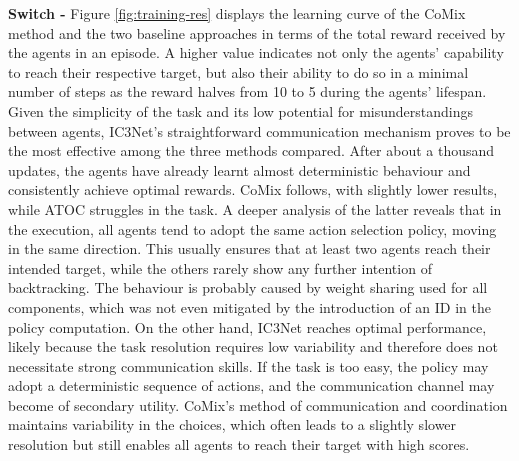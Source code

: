 \documentclass[a4paper,singleside,12pt]{report} %
\begin{document}
\textbf{Switch - } Figure \ref{fig:training-res} displays the learning curve of the CoMix method and the two baseline approaches in terms of the total reward received by the agents in an episode. A higher value indicates not only the agents' capability to reach their respective target, but also their ability to do so in a minimal number of steps as the reward halves from 10 to 5 during the agents' lifespan.\\
Given the simplicity of the task and its low potential for misunderstandings between agents, IC3Net's straightforward communication mechanism proves to be the most effective among the three methods compared. After about a thousand updates, the agents have already learnt almost deterministic behaviour and consistently achieve optimal rewards. CoMix follows, with slightly lower results, while ATOC struggles in the task. A deeper analysis of the latter reveals that in the execution, all agents tend to adopt the same action selection policy, moving in the same direction. This usually ensures that at least two agents reach their intended target, while the others rarely show any further intention of backtracking. The behaviour is probably caused by weight sharing used for all components, which was not even mitigated by the introduction of an ID in the policy computation. On the other hand, IC3Net reaches optimal performance, likely because the task resolution requires low variability and therefore does not necessitate strong communication skills. If the task is too easy, the policy may adopt a deterministic sequence of actions, and the communication channel may become of secondary utility. CoMix's method of communication and coordination maintains variability in the choices, which often leads to a slightly slower resolution but still enables all agents to reach their target with high scores.\\\\
\end{document}
